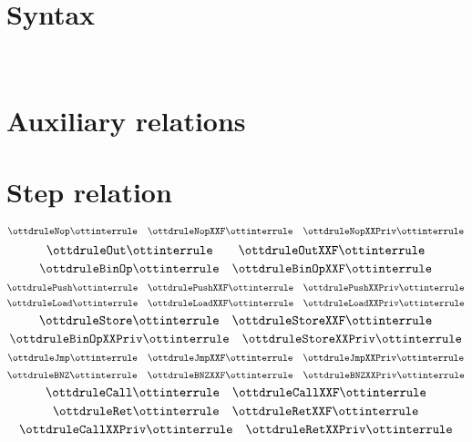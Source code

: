 \documentclass{scrartcl}
\begin{document}
\section*{Syntax}

\ottmetavars\\[3ex]

\ottgrammartabular{
\ottn\ottinterrule
\ottL\ottinterrule
\otta\ottinterrule
\ottinstr\ottinterrule
\ottS\ottinterrule
}

\section*{Auxiliary relations}

\ottgrammartabular{
\ottformula\ottinterrule
}

\pagebreak
\section*{Step relation}

\small


\[ \ottdruleNop \ottinterrule 
   \quad \ottdruleNopXXF \ottinterrule 
   \quad \ottdruleNopXXPriv \ottinterrule \]
\[ \ottdruleOut \ottinterrule
   \qquad  \ottdruleOutXXF \ottinterrule \]
\[ \ottdruleBinOp \ottinterrule
   \quad \ottdruleBinOpXXF \ottinterrule \]
\[ \ottdrulePush \ottinterrule 
   \quad \ottdrulePushXXF \ottinterrule
   \quad \ottdrulePushXXPriv \ottinterrule \]
 \[ \ottdruleLoad \ottinterrule 
   \quad \ottdruleLoadXXF \ottinterrule
   \quad \ottdruleLoadXXPriv \ottinterrule \]
\[ \ottdruleStore \ottinterrule
   \quad \ottdruleStoreXXF \ottinterrule \]
\[ \ottdruleBinOpXXPriv \ottinterrule
   \quad \ottdruleStoreXXPriv \ottinterrule \]
\[ \ottdruleJmp \ottinterrule
   \quad \ottdruleJmpXXF \ottinterrule 
   \quad \ottdruleJmpXXPriv \ottinterrule \]
\[ \ottdruleBNZ \ottinterrule 
   \quad  \ottdruleBNZXXF \ottinterrule
   \quad  \ottdruleBNZXXPriv \ottinterrule  \] 
\[ \ottdruleCall \ottinterrule
   \quad  \ottdruleCallXXF \ottinterrule \]
\[ \ottdruleRet \ottinterrule   
   \quad  \ottdruleRetXXF \ottinterrule  \] 
\[ \ottdruleCallXXPriv \ottinterrule
   \quad  \ottdruleRetXXPriv \ottinterrule \] 

\end{document}
